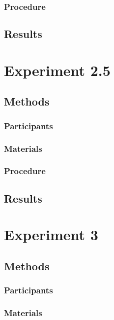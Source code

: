 \documentclass{article}
\begin{document}
	\subsubsection{Procedure}
	
	\subsection{Results}
	
	\newpage
	\section{Experiment 2.5}
	
	\subsection{Methods}
	
	\subsubsection{Participants}
	
	\subsubsection{Materials}
	
	\subsubsection{Procedure}
	
	\subsection{Results}
	
	\newpage
	\section{Experiment 3}
	
	\subsection{Methods}
	
	\subsubsection{Participants}
	
	\subsubsection{Materials}
	
\end{document}
